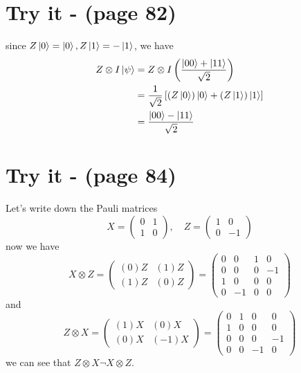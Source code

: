 \documentclass[12pt]{article}
\begin{document}
\section*{Try it - (page 82)}
since \( Z\ket{0} = \ket{0}, Z\ket{1} = -\ket{1} \), we have
\begin{align*}
   Z \otimes I \ket{\psi} &= Z \otimes I \left( \frac{\ket{00} + \ket{11}}{\sqrt{2}} \right) \\
   &= \frac{1}{\sqrt{2}} \left[ (Z\ket{0})\ket{0} + (Z\ket{1})\ket{1} \right] \\
   &= \frac{\ket{00} - \ket{11}}{\sqrt{2}}
\end{align*}

\section*{Try it - (page 84)}
Let's write down the Pauli matrices
\[
X = \begin{pmatrix} 0 & 1 \\ 1 & 0 \end{pmatrix}, \quad Z = \begin{pmatrix} 1 & 0 \\ 0 & -1 \end{pmatrix}
\]
now we have
\[
X \otimes Z = 
\begin{pmatrix}
(0)Z & (1)Z \\
(1)Z & (0)Z
\end{pmatrix}
=
\begin{pmatrix}
0 & 0 & 1 & 0 \\
0 & 0 & 0 & -1 \\
1 & 0 & 0 & 0 \\
0 & -1 & 0 & 0
\end{pmatrix}
\]
and 
\[
Z \otimes X = 
\begin{pmatrix}
(1)X & (0)X \\
(0)X & (-1)X
\end{pmatrix}
=
\begin{pmatrix}
0 & 1 & 0 & 0 \\
1 & 0 & 0 & 0 \\
0 & 0 & 0 & -1 \\
0 & 0 & -1 & 0
\end{pmatrix}
\]
we can see that \(Z \otimes X \neg X \otimes Z\).
\end{document}
